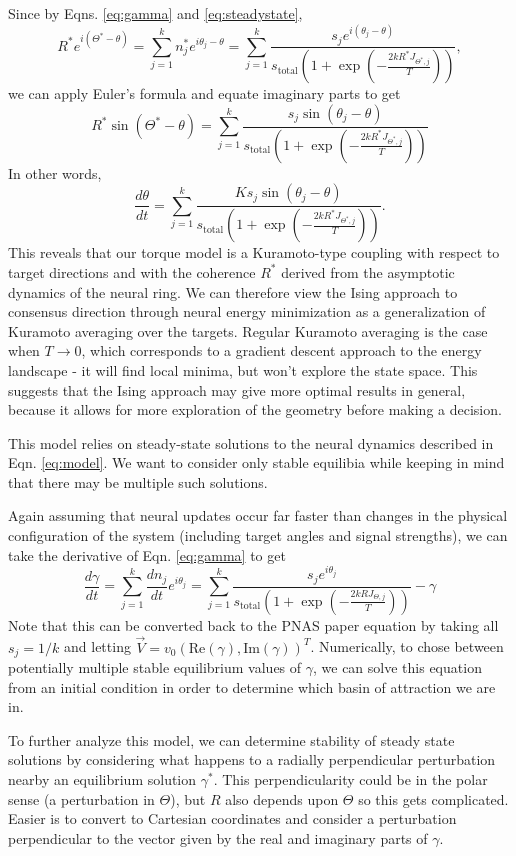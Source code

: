 \documentclass[12pt]{article}
\begin{document}
Since by Eqns. \eqref{eq:gamma} and \eqref{eq:steadystate},
\[
R^*e^{i(\Theta^*-\theta)} = \sum_{j=1}^{k}n_j^* e^{i\theta_j-\theta} = \sum_{j=1}^{k}\frac{s_j e^{i(\theta_j-\theta)}}{s_{\text{total}}\left(1+\exp\left(-\frac{2kR^*J_{\Theta^*,j}}{T}\right)\right)},
\]
we can apply Euler's formula and equate imaginary parts to get
\[
R^*\sin(\Theta^*-\theta) = \sum_{j=1}^{k}\frac{s_j \sin(\theta_j-\theta)}{s_{\text{total}}\left(1+\exp\left(-\frac{2kR^*J_{\Theta^*,j}}{T}\right)\right)}
\]
In other words,
\[
\frac{d\theta}{dt} = \sum_{j=1}^{k}\frac{Ks_j\sin(\theta_j - \theta)}{s_{\text{total}}\left(1+\exp\left(-\frac{2kR^*J_{\Theta^*,j}}{T}\right)\right)}.
\]
This reveals that our torque model is a Kuramoto-type coupling with respect to target directions and with the coherence $R^*$ derived from the asymptotic dynamics of the neural ring. We can therefore view the Ising approach to consensus direction through neural energy minimization as a generalization of Kuramoto averaging over the targets. Regular Kuramoto averaging is the case when $T\rightarrow 0$, which corresponds to a gradient descent approach to the energy landscape - it will find local minima, but won't explore the state space. This suggests that the Ising approach may give more optimal results in general, because it allows for more exploration of the geometry before making a decision.

This model relies on steady-state solutions to the neural dynamics described in Eqn. \eqref{eq:model}. We want to consider only stable equilibia while keeping in mind that there may be multiple such solutions.

Again assuming that neural updates occur far faster than changes in the physical configuration of the system (including target angles and signal strengths), we can take the derivative of Eqn. \eqref{eq:gamma} to get
\begin{equation}
	\frac{d\gamma}{dt} = \sum_{j=1}^{k}\frac{dn_j}{dt}e^{i\theta_j} = \sum_{j=1}^{k}\frac{s_je^{i\theta_j}}{s_{\text{total}}\left(1+\exp\left(-\frac{2kRJ_{\Theta,j}}{T}\right)\right)} - \gamma\label{eq:dgamma}
\end{equation}
Note that this can be converted back to the PNAS paper equation by taking all $s_j=1/k$ and letting $\vec{V}=v_0(\text{Re}(\gamma),\text{Im}(\gamma))^T$. Numerically, to chose between potentially multiple stable equilibrium values of $\gamma$, we can solve this equation from an initial condition in order to determine which basin of attraction we are in.

To further analyze this model, we can determine stability of steady state solutions by considering what happens to a radially perpendicular perturbation nearby an equilibrium solution $\gamma^*$. This perpendicularity could be in the polar sense (a perturbation in $\Theta$), but $R$ also depends upon $\Theta$ so this gets complicated. Easier is to convert to Cartesian coordinates and consider a perturbation perpendicular to the vector given by the real and imaginary parts of $\gamma$.
\end{document}
